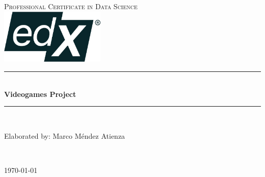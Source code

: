 \begin{titlepage}

\newcommand{\HRule}{\rule{\linewidth}{0.5mm}} 

\center 

\vfill
 
\textsc{\LARGE Professional Certificate in Data Science}\\[1.5cm] 
\includegraphics[width = 5cm]{edx.png}\\

\vfill

\HRule \\[0.4cm]
{ \huge \bfseries Videogames Project}\\[0.4cm]
\HRule \\[1.5cm]

\vfill

\begin{minipage}{0.5\textwidth}
\begin{center} \large
Elaborated by: Marco Méndez Atienza\\ 
\end{center}

\vfill

\end{minipage}\\[2cm]

\vfill

{\large \today}\\[2cm] 

\vfill 

\end{titlepage}
